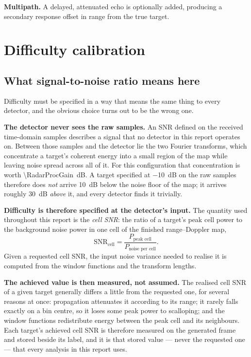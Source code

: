 \textbf{Multipath.} A delayed, attenuated echo is optionally added, producing a secondary response
offset in range from the true target.

\section{Difficulty calibration}

\subsection{What signal-to-noise ratio means here}

Difficulty must be specified in a way that means the same thing to every detector, and the obvious
choice turns out to be the wrong one.

\textbf{The detector never sees the raw samples.} An SNR defined on the received time-domain
samples describes a signal that no detector in this report operates on. Between those samples and
the detector lie the two Fourier transforms, which concentrate a target's coherent energy into a
small region of the map while leaving noise spread across all of it. For this configuration that
concentration is worth \SI{\RadarProcGain}{\deci\bel}. A target specified at
\SI{-10}{\deci\bel} on the raw samples therefore does \emph{not} arrive \SI{10}{\deci\bel} below
the noise floor of the map; it arrives roughly \SI{30}{\deci\bel} \emph{above} it, and every
detector finds it trivially.

\textbf{Difficulty is therefore specified at the detector's input.} The quantity used throughout
this report is the \emph{cell SNR}: the ratio of a target's peak cell power to the background noise
power in one cell of the finished range--Doppler map,
\begin{equation}
\mathrm{SNR}_{\text{cell}} =
\frac{P_{\text{peak cell}}}{P_{\text{noise per cell}}} .
\label{eq:cellsnr}
\end{equation}
Given a requested cell SNR, the input noise variance needed to realise it is computed from the
window functions and the transform lengths.

\textbf{The achieved value is then measured, not assumed.} The realised cell SNR of a given target
generally differs a little from the requested one, for several reasons at once: propagation
attenuates it according to its range; it rarely falls exactly on a bin centre, so it loses some
peak power to scalloping; and the window functions redistribute energy between the peak cell and
its neighbours. Each target's achieved cell SNR is therefore measured on the generated frame and
stored beside its label, and it is that stored value --- never the requested one --- that every
analysis in this report uses.

